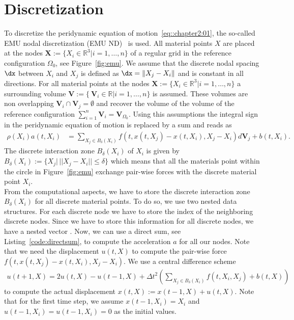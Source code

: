 \section{Discretization}
To discretize the peridynamic equation of motion~\eqref{eq::chapter2:01}, the so-called EMU nodal discretization (EMU ND)~\cite{parks2008implementing} is used. All material points $X$ are placed at the nodes $\mathbf{X}:=\lbrace X_i \in \mathbb{R}^3\vert i=1,\ldots,n\rbrace$ of a regular grid in the reference configuration $\Omega_0$, see Figure~\ref{fig:emu}. We assume that the  discrete nodal spacing $\dx$ between $X_i$ and $X_j$ is defined as $\dx = \Vert X_j - X_i \Vert$ and is constant in all directions. For all material points at the nodes $\mathbf{X}:=\lbrace X_i \in \mathbb{R}^3\vert i=1,\ldots,n\rbrace$ a surrounding volume $\mathbf{V}:=\lbrace\ \mathbf{V}_i \in \mathbb{R}\vert i=1,\ldots,n\rbrace$ is assumed. These volumes are non overlapping $\mathbf{V}_i \cap \mathbf{V}_j = \emptyset$ and recover the volume of the volume of the reference configuration $\sum_{i=1}^n \mathbf{V}_i = \mathbf{V}_{\Omega_0}$. Using this assumptions the integral sign in the peridynamic equation of motion is replaced by a sum and reads as
\begin{align}
\rho(X_i)a(t,X_i)&=\sum\limits_{X_j\in B_\delta(X_i)}  f\left(t,x(t,X_j)-x(t,X_i), X_j-X_i\right)d\mathbf{V}_j + b(t,X_i) \text{.}
\label{eq:discrete:pd}
\end{align}
The discrete interaction zone $B_\delta(X_i)$ of $X_i$ is given by $B_\delta(X_i):=\lbrace X_j \vert \,\vert\vert X_j-X_i\vert\vert \leq \delta\rbrace$ which means that all the materials point within the circle in Figure~\ref{fig:emu} exchange pair-wise forces with the discrete material point $X_i$.\\

From the computational aspects, we have to store the discrete interaction zone $B_\delta(X_i)$ for all discrete material points. To do so, we use two nested  data structures. For each discrete node we have  to store the index of the neighboring discrete nodes. Since we have to store this information for all discrete nodes, we have a nested vector . Now, we can use a direct sum, see Listing~\ref{code:directsum}, to compute the acceleration $a$ for all our nodes. Note that we need the displacement 
$u(t,X)$ to compute the pair-wise force $f\left(t,x(t,X_j)-x(t,X_i), X_j-X_i\right)$. We use a central difference scheme 
\begin{align}
u(t+1,X) =  2 u(t,X) - u(t-1,X) + \Delta t^2 \left(\sum\limits_{X_j\in B_\delta(X_i)} f(t,X_i,X_j)+b(t,X)\right)
\label{eq:pd:displacement}
\end{align}
to compute the actual displacement $x(t,X):= x(t-1,X) + u(t,X)$. Note that for the first time step, we assume $x(t-1,X_i)=X_i$ and $u(t-1,X_i)=u(t-1,X_i)=0$ as the initial values.

